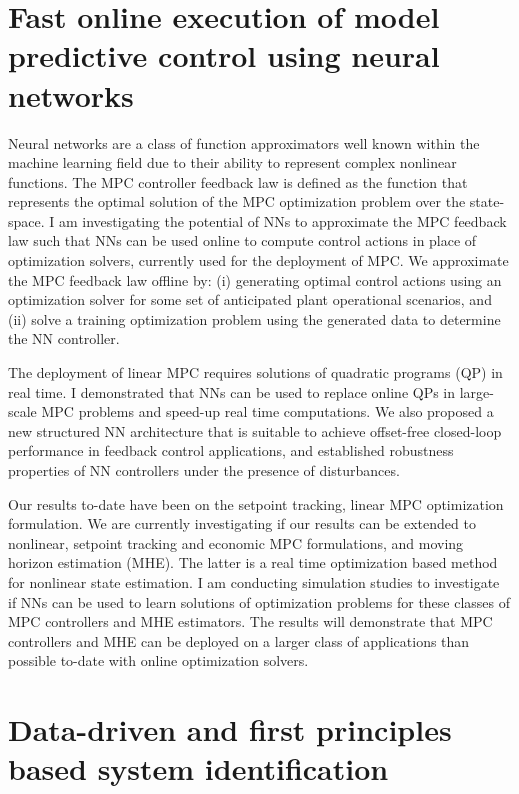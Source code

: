 \documentclass[11pt, a4paper]{article} %
\begin{document}
\section*{Fast online execution of model predictive control using neural 
networks}

Neural networks are a class of function approximators well known within the 
machine learning field due to their ability to represent complex nonlinear 
functions. The MPC controller feedback law is defined as the 
function that represents the optimal solution of the MPC optimization problem 
over the state-space.  
I am investigating the potential of NNs to approximate the MPC 
feedback law such that NNs can be used online to compute control actions in 
place of optimization solvers, currently used for the deployment of MPC. 
We approximate the MPC feedback law offline by: (i) generating optimal control 
actions using an optimization solver for some set of anticipated plant 
operational scenarios, and (ii) solve a training optimization problem using the 
generated data to determine the NN controller.

The deployment of linear MPC requires solutions of quadratic programs (QP) in 
real time. I demonstrated \cite{kumar:rawlings:wright:2021} that NNs can be 
used to replace online QPs in large-scale MPC problems and speed-up real time 
computations. We also proposed a new structured NN architecture that is 
suitable to achieve offset-free closed-loop performance in feedback control 
applications, and established robustness properties of NN controllers under the 
presence of disturbances.
 
Our results to-date have been on the setpoint tracking, linear MPC optimization 
formulation. We are currently investigating if our results can be extended to 
nonlinear, setpoint tracking and economic MPC formulations, and moving horizon 
estimation (MHE). The latter is a real time optimization based method for 
nonlinear state estimation. I am conducting simulation studies to investigate 
if NNs can be used to learn solutions of optimization problems for these 
classes of MPC controllers and MHE  estimators. The results will demonstrate 
that MPC controllers and MHE can be deployed on a larger class of applications 
than possible to-date with online optimization solvers.

\section*{Data-driven and first principles based system identification}
\end{document}
